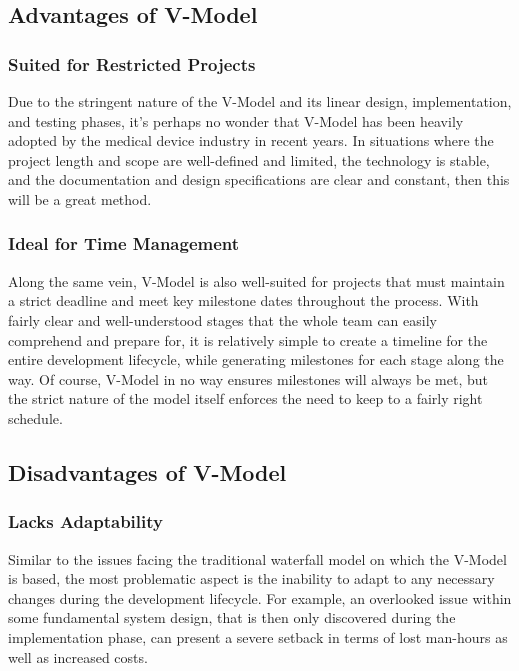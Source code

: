 \documentclass[main.tex]{subfiles}
\begin{document}
\subsection{Advantages of V-Model}

\subsubsection{Suited for Restricted Projects}
Due to the stringent nature of the V-Model and its linear design, implementation, and testing phases, it's perhaps no wonder that V-Model has been heavily adopted by the medical device industry in recent years.
In situations where the project length and scope are well-defined and limited, the technology is stable, and the documentation and design specifications are clear and constant, then this will be a great method.

\subsubsection{Ideal for Time Management}
Along the same vein, V-Model is also well-suited for projects that must maintain a strict deadline and meet key milestone dates throughout the process.
With fairly clear and well-understood stages that the whole team can easily comprehend and prepare for, it is relatively simple to create a timeline for the entire development lifecycle, while generating milestones for each stage along the way. Of course, V-Model in no way ensures milestones will always be met, but the strict nature of the model itself enforces the need to keep to a fairly right schedule.

\subsection{Disadvantages of V-Model}

\subsubsection{Lacks Adaptability}
Similar to the issues facing the traditional waterfall model on which the V-Model is based, the most problematic aspect is the inability to adapt to any necessary changes during the development lifecycle.
For example, an overlooked issue within some fundamental system design, that is then only discovered during the implementation phase, can present a severe setback in terms of lost man-hours as well as increased costs.
\end{document}
